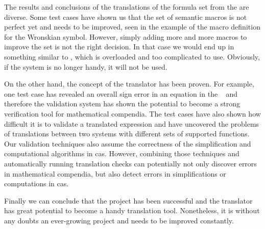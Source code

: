 The results and conclusions of the translations of the formula set from the \DLMF{} are diverse. Some test cases have shown us that the set of semantic macros is not perfect yet and needs to be improved, seen in the example of the macro definition for the Wronskian symbol. However, simply adding more and more macros to improve the set is not the right decision. In that case we would end up in something similar to \sTeX, which is overloaded and too complicated to use. Obviously, if the system is no longer handy, it will not be used.

On the other hand, the concept of the translator has been proven. For example, one test case has revealed an overall sign error in an equation in the \DLMF~\cite[(14.5.14)]{NIST:DLMF} and therefore the validation system has shown the potential to become a strong verification tool for mathematical compendia. The test cases have also shown how difficult it is to validate a translated expression and have uncovered the problems of translations between two systems with different sets of supported functions. Our validation techniques also assume the correctness of the simplification and computational algorithms in \gls{cas}. However, combining those techniques and automatically running translation checks can potentially not only discover errors in mathematical compendia, but also detect errors in simplifications or computations in \gls{cas}.

Finally we can conclude that the project has been successful and the translator has great potential to become a handy translation tool. Nonetheless, it is without any doubts an ever-growing project and needs to be improved constantly.
